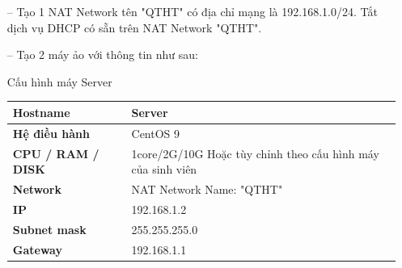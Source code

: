 \documentclass[a4paper, 11pt]{article}
\begin{document}
\begin{itemize}
    \item[--] Tạo 1 NAT Network tên "QTHT" có địa chỉ mạng là 192.168.1.0/24. Tắt dịch vụ DHCP có sẵn trên NAT Network "QTHT".
    \item[--] Tạo 2 máy ảo với thông tin như sau: \hfill \\
          \begin{minipage}{\linewidth}
              \begin{multicols}{2}
                  \begin{minipage}{\linewidth}
                      \captionsetup{type=table}
                      \caption{Cấu hình máy Server}
                      \centering
                      \begin{tabular}{| p{.4\linewidth} | p{.4\linewidth} |}
                          \hline
                          \textbf{Hostname}         & Server                                                               \\
                          \hline

                          \textbf{Hệ điều hành}     & CentOS 9                                                             \\
                          \hline

                          \textbf{CPU / RAM / DISK} & 1core/2G/10G \newline Hoặc tùy chỉnh theo cấu hình máy của sinh viên \\
                          \hline

                          \textbf{Network}          & NAT Network \newline Name: "QTHT"                                    \\
                          \hline

                          \textbf{IP}               & 192.168.1.2                                                          \\
                          \hline

                          \textbf{Subnet mask}      & 255.255.255.0                                                        \\
                          \hline

                          \textbf{Gateway}          & 192.168.1.1                                                          \\
                          \hline


\end{tabular}
\end{minipage}
\end{multicols}
\end{minipage}
\end{itemize}
\end{document}
